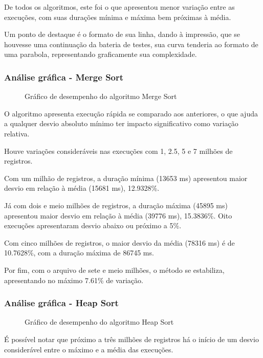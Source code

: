 \documentclass[a4paper,12pt]{scrartcl}
\begin{document}
De todos os algoritmos, este foi o que apresentou menor variação entre as execuções, com suas durações mínima e máxima bem próximas à média.

Um ponto de destaque é o formato de sua linha, dando à impressão, que se houvesse uma continuação da bateria de testes, sua curva tenderia ao formato de uma parabola, representando graficamente sua complexidade.

\subsubsection{Análise gráfica - Merge Sort}
\begin{figure}[H]
    \centering
    
    \caption{Gráfico de desempenho do algoritmo Merge Sort}
    \label{mapaSelect}
\end{figure}

O algoritmo apresenta execução rápida se comparado aos anteriores, o que ajuda a qualquer desvio absoluto mínimo ter impacto significativo como variação relativa.

Houve variações consideráveis nas execuções com 1, 2.5, 5 e 7 milhões de registros.

Com um milhão de registros, a duração mínima (13653 ms) apresentou maior desvio em relação à média (15681 ms), 12.9328\%.

Já com dois e meio milhões de registros, a duração máxima (45895 ms) apresentou maior desvio em relação à média (39776 ms), 15.3836\%. Oito execuções apresentaram desvio abaixo ou próximo a 5\%.

Com cinco milhões de registros, o maior desvio da média (78316 ms) é de 10.7628\%, com a duração máxima de 86745 ms.

Por fim, com o arquivo de sete e meio milhões, o método se estabiliza, apresentando no máximo 7.61\% de variação.

\subsubsection{Análise gráfica - Heap Sort}
\begin{figure}[H]
    \centering
    
    \caption{Gráfico de desempenho do algoritmo Heap Sort}
    \label{mapaSelect}
\end{figure}

É possível notar que próximo a três milhões de registros há o início de um desvio considerável entre o máximo e a média das execuções.
\end{document}
